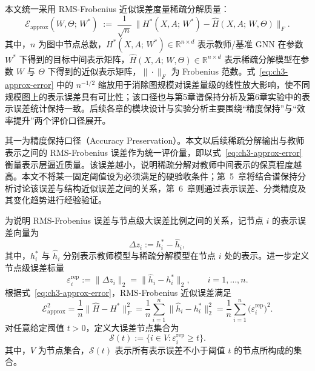 本文统一采用 RMS-Frobenius 近似误差度量稀疏分解质量：
\begin{equation}
  \mathcal{E}_{\mathrm{approx}}(W, \Theta;\, W^*)
  \;:=\; \frac{1}{\sqrt{n}}\,\bigl\|H^*(X,A;\,W^*) - \hat{H}(X,A;\,W,\Theta)\bigr\|_F.
  \label{eq:ch3-approx-error}
\end{equation}
其中，$n$ 为图中节点总数，$H^*(X,A;\,W^*)\in\mathbb{R}^{n\times d}$ 表示教师/基准 GNN 在参数 $W^*$ 下得到的目标中间表示矩阵，$\hat{H}(X,A;\,W,\Theta)\in\mathbb{R}^{n\times d}$ 表示稀疏分解模型在参数 $W$ 与 $\Theta$ 下得到的近似表示矩阵，$\|\cdot\|_F$ 为 Frobenius 范数。式~\eqref{eq:ch3-approx-error} 中的 $n^{-1/2}$ 缩放用于消除图规模对误差量级的线性放大影响，使不同规模图上的表示误差具有可比性；该口径也与第5章谱保持分析及第6章实验中的表示误差统计保持一致。后续各章的模块设计与实验分析主要围绕“精度保持”与“效率提升”两个评价口径展开。

其一为精度保持口径（Accuracy Preservation）。本文以后续稀疏分解输出与教师表示之间的 RMS-Frobenius 误差作为统一评价量，即以式~\eqref{eq:ch3-approx-error} 衡量表示层逼近质量。该误差越小，说明稀疏分解对教师中间表示的保真程度越高。本文不将某一固定阈值设为必须满足的硬验收条件；第~5~章将结合谱保持分析讨论该误差与结构近似误差之间的关系，第~6~章则通过表示误差、分类精度及其变化趋势进行经验验证。

为说明 RMS-Frobenius 误差与节点级大误差比例之间的关系，记节点 $i$ 的表示误差向量为
\begin{equation}
  \Delta z_i:=h_i^*-\hat{h}_i,
  \label{eq:ch3-delta-z}
\end{equation}
其中，$h_i^*$ 与 $\hat{h}_i$ 分别表示教师模型与稀疏分解模型在节点 $i$ 处的表示。进一步定义节点级误差标量
\begin{equation}
  \varepsilon_i^{\mathrm{rep}}:=\|\Delta z_i\|_2=\|\hat{h}_i-h_i^*\|_2,\qquad i=1,\ldots,n.
  \label{eq:ch3-node-error}
\end{equation}
根据式~\eqref{eq:ch3-approx-error}，RMS-Frobenius 近似误差满足
\begin{equation}
  \mathcal{E}_{\mathrm{approx}}^2
  =
  \frac{1}{n}\|\hat{H}-H^*\|_F^2
  =
  \frac{1}{n}\sum_{i=1}^{n}\|\hat{h}_i-h_i^*\|_2^2
  =
  \frac{1}{n}\sum_{i=1}^{n}\bigl(\varepsilon_i^{\mathrm{rep}}\bigr)^2.
  \label{eq:ch3-rms-node-error}
\end{equation}
对任意给定阈值 $t>0$，定义大误差节点集合为
\begin{equation}
  \mathcal{S}(t):=\{i\in V:\varepsilon_i^{\mathrm{rep}}\geq t\}.
  \label{eq:ch3-large-error-set}
\end{equation}
其中，$V$ 为节点集合，$\mathcal{S}(t)$ 表示所有表示误差不小于阈值 $t$ 的节点所构成的集合。

